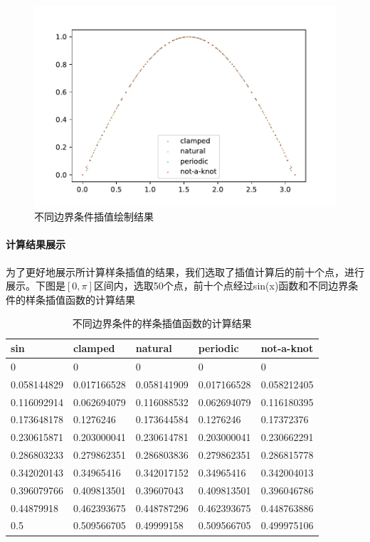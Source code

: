 \begin{figure}[H]
	\centering
	\caption{不同边界条件插值绘制结果}
	\includegraphics[width=.9\linewidth]{4-4.pdf}
\end{figure}

\paragraph{计算结果展示}


为了更好地展示所计算样条插值的结果，我们选取了插值计算后的前十个点，进行展示。下图是$[0,\pi]$区间内，选取50个点，前十个点经过sin(x)函数和不同边界条件的样条插值函数的计算结果


\begin{table}[H]
	\centering
	\caption{不同边界条件的样条插值函数的计算结果}
	\begin{tabular}{lllll}
		\hline
		sin         & clamped     & natural     & periodic    & not-a-knot  \\ \hline
		0           & 0           & 0           & 0           & 0           \\
		0.058144829 & 0.017166528 & 0.058141909 & 0.017166528 & 0.058212405 \\
		0.116092914 & 0.062694079 & 0.116088532 & 0.062694079 & 0.116180395 \\
		0.173648178 & 0.1276246   & 0.173644584 & 0.1276246   & 0.17372376  \\
		0.230615871 & 0.203000041 & 0.230614781 & 0.203000041 & 0.230662291 \\
		0.286803233 & 0.279862351 & 0.286803836 & 0.279862351 & 0.286815778 \\
		0.342020143 & 0.34965416  & 0.342017152 & 0.34965416  & 0.342004013 \\
		0.396079766 & 0.409813501 & 0.39607043  & 0.409813501 & 0.396046786 \\
		0.44879918  & 0.462393675 & 0.448787296 & 0.462393675 & 0.448763886 \\
		0.5         & 0.509566705 & 0.49999158  & 0.509566705 & 0.499975106 \\ \hline

	\end{tabular}
\end{table}



